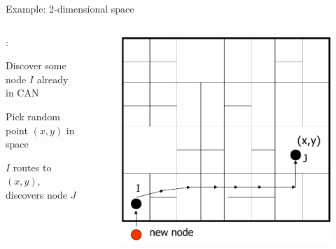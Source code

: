 \begin{frame}{Example: 2-dimensional space}

\begin{columns}
\begin{column}{0.5\textwidth}
:\\
\BE
\item Discover some node $I$ already in CAN
\item Pick random point $(x,y)$ in space
\item $I$ routes to $(x,y)$, discovers node $J$ 
\EE
\end{column}
\begin{column}{0.5\textwidth}
\begin{figure}
	\includegraphics[width=1.0\textwidth]{figs/10/can-join1}
\end{figure}
\end{column}
\end{columns}

\end{frame}

